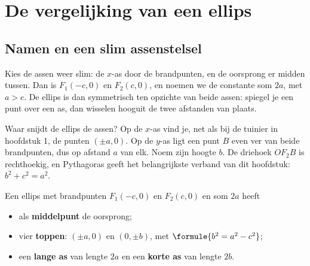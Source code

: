 \section{De vergelijking van een ellips}

\subsection{Namen en een slim assenstelsel}

Kies de assen weer slim: de $x$-as door de brandpunten, en de oorsprong er midden tussen. Dan is $F_1(-c, 0)$ en $F_2(c, 0)$, en noemen we de constante som $2a$, met $a > c$. De ellips is dan symmetrisch ten opzichte van beide assen: spiegel je een punt over een as, dan wisselen hooguit de twee afstanden van plaats.

Waar snijdt de ellips de assen? Op de $x$-as vind je, net als bij de tuinier in hoofdstuk 1, de punten $(\pm a, 0)$. Op de $y$-as ligt een punt $B$ even ver van beide brandpunten, dus op afstand $a$ van elk. Noem zijn hoogte $b$. De driehoek $OF_2B$ is rechthoekig, en Pythagoras geeft het belangrijkste verband van dit hoofdstuk: $b^2 + c^2 = a^2$.

\begin{theorie}
\begin{minipage}[t]{.6\linewidth}
\vspace{0pt}
Een ellips met brandpunten $F_1(-c, 0)$ en $F_2(c, 0)$ en som $2a$ heeft
\begin{itemize}
\item als \textbf{\textcolor{accent}{middelpunt}} de oorsprong;
\item vier \textbf{\textcolor{accent}{toppen}}: $(\pm a, 0)$ en $(0, \pm b)$, met $\formule{b^2 = a^2 - c^2}$;
\item een \textbf{\textcolor{accent}{lange as}} van lengte $2a$ en een \textbf{\textcolor{accent}{korte as}} van lengte $2b$.
\end{itemize}
\end{minipage}\hfill
\begin{minipage}[t]{.36\linewidth}
\vspace{0pt}
\centering
{}
\end{minipage}
\end{theorie}

